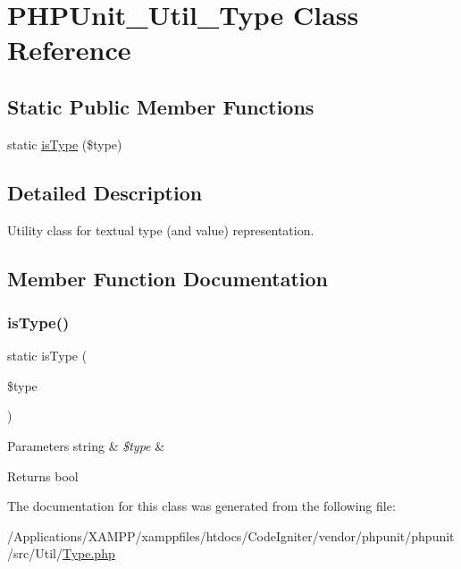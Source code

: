 \hypertarget{class_p_h_p_unit___util___type}{}\section{P\+H\+P\+Unit\+\_\+\+Util\+\_\+\+Type Class Reference}
\label{class_p_h_p_unit___util___type}
\subsection*{Static Public Member Functions}
\begin{DoxyCompactItemize}
\item 
static \mbox{\hyperlink{class_p_h_p_unit___util___type_a5ce9b7cd8339182d239a947cabcc9059}{is\+Type}} (\$type)
\end{DoxyCompactItemize}


\subsection{Detailed Description}
Utility class for textual type (and value) representation. 

\subsection{Member Function Documentation}
\mbox{\label{class_p_h_p_unit___util___type_a5ce9b7cd8339182d239a947cabcc9059}} 
\subsubsection{\texorpdfstring{is\+Type()}{isType()}}
{\footnotesize\ttfamily static is\+Type (\begin{DoxyParamCaption}\item[{}]{\$type }\end{DoxyParamCaption})\hspace{0.3cm}{\ttfamily [static]}}


\begin{DoxyParams}[1]{Parameters}
string & {\em \$type} & \\
\hline
\end{DoxyParams}
\begin{DoxyReturn}{Returns}
bool 
\end{DoxyReturn}


The documentation for this class was generated from the following file\+:\begin{DoxyCompactItemize}
\item 
/\+Applications/\+X\+A\+M\+P\+P/xamppfiles/htdocs/\+Code\+Igniter/vendor/phpunit/phpunit/src/\+Util/\mbox{\hyperlink{phpunit_2phpunit_2src_2_util_2_type_8php}{Type.\+php}}\end{DoxyCompactItemize}
